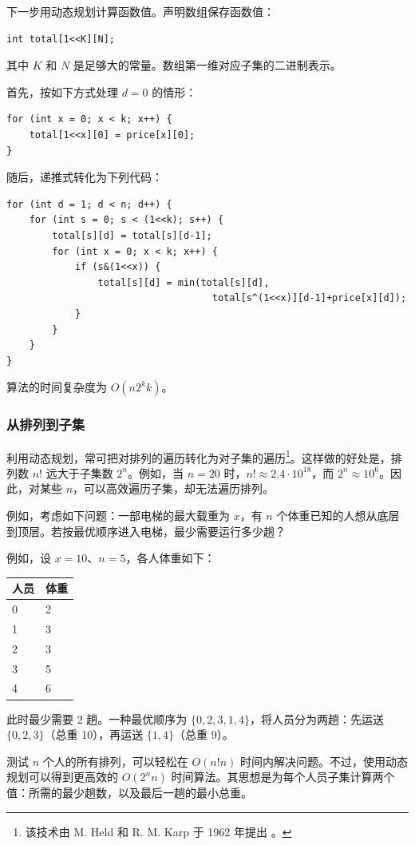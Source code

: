 下一步用动态规划计算函数值。声明数组保存函数值：
\begin{lstlisting}
int total[1<<K][N];
\end{lstlisting}
其中 $K$ 和 $N$ 是足够大的常量。数组第一维对应子集的二进制表示。

首先，按如下方式处理 $d=0$ 的情形：
\begin{lstlisting}
for (int x = 0; x < k; x++) {
    total[1<<x][0] = price[x][0];
}
\end{lstlisting}
随后，递推式转化为下列代码：
\begin{lstlisting}
for (int d = 1; d < n; d++) {
    for (int s = 0; s < (1<<k); s++) {
        total[s][d] = total[s][d-1];
        for (int x = 0; x < k; x++) {
            if (s&(1<<x)) {
                total[s][d] = min(total[s][d],
                                    total[s^(1<<x)][d-1]+price[x][d]);
            }
        }
    }
}
\end{lstlisting}
算法的时间复杂度为 $O(n2^kk)$。

\subsubsection{从排列到子集}

利用动态规划，常可把对排列的遍历转化为对子集的遍历\footnote{该技术由 M. Held 和 R. M. Karp 于 1962 年提出 \cite{hel62}。}。这样做的好处是，排列数 $n!$ 远大于子集数 $2^n$。例如，当 $n=20$ 时，$n!\approx2.4\cdot10^{18}$，而 $2^n\approx10^6$。因此，对某些 $n$，可以高效遍历子集，却无法遍历排列。

例如，考虑如下问题：一部电梯的最大载重为 $x$，有 $n$ 个体重已知的人想从底层到顶层。若按最优顺序进入电梯，最少需要运行多少趟？

例如，设 $x=10$、$n=5$，各人体重如下：
\begin{center}
\begin{tabular}{ll}
人员 & 体重 \\
\hline
0 & 2 \\
1 & 3 \\
2 & 3 \\
3 & 5 \\
4 & 6 \\
\end{tabular}
\end{center}
此时最少需要 2 趟。一种最优顺序为 $\{0,2,3,1,4\}$，将人员分为两趟：先运送 $\{0,2,3\}$（总重 10），再运送 $\{1,4\}$（总重 9）。

测试 $n$ 个人的所有排列，可以轻松在 $O(n!n)$ 时间内解决问题。不过，使用动态规划可以得到更高效的 $O(2^nn)$ 时间算法。其思想是为每个人员子集计算两个值：所需的最少趟数，以及最后一趟的最小总重。

